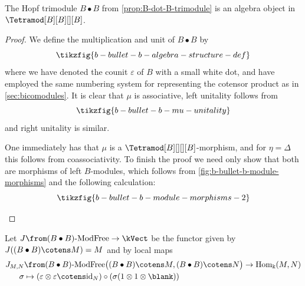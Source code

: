 \begin{proposition}\label{prop:b-dot-b-is-algebra-object}
  The Hopf trimodule \(B \bullet B\) from \cref{prop:B-dot-B-trimodule} is an algebra object in \(\Tetramod[B][B][][B]\).
\end{proposition}
\begin{proof}
  We define the multiplication and unit of \(B \bullet B\) by
  \[
    \tikzfig{b-bullet-b-algebra-structure-def}
  \]
  where we have denoted the counit \(\varepsilon\) of \(B\) with a small white dot,
  and have employed the same numbering system for representing the cotensor product as in \cref{sec:bicomodules}.
  It is clear that \(\mu\) is associative,
  left unitality follows from
  \[
    \tikzfig{b-bullet-b-mu-unitality}
  \]
  and right unitality is similar.

  One immediately has that \(\mu\) is a \(\Tetramod[B][][][B]\)\hyp{}morphism,
  and for \(\eta = \Delta\) this follows from coassociativity.
  To finish the proof we need only show that both are morphisms of left \(B\)\hyp{}modules,
  which follows from \cref{fig:b-bullet-b-module-morphisms}
  and the following calculation:
  \[
    \tikzfig{b-bullet-b-module-morphisms-2}
  \]
  \begin{figure}[htbp]
    \centering
    \vspace{-\onelineskip}%
  \end{figure}
\end{proof}

\begin{definition}\label{jequivalence}
  Let \(J\from (B \bullet B)\textnormal{-ModFree} \to \kVect\) be the functor given by \(J((B \bullet B) \cotens M) = M\) and by local maps
  \[
    \begin{aligned}
      J_{M,N}&\from (B\bullet B)\textnormal{-ModFree}\big((B\bullet B)\cotens M,  (B\bullet B)\cotens N \big) \to \mathrm{Hom}_{\Bbbk}(M,N) \\
      \sigma &\mapsto (\varepsilon \otimes \varepsilon \cotens \mathrm{id}_{N})\circ(\sigma(1 \otimes 1 \otimes \blank))
    \end{aligned}
  \]
\end{definition}

